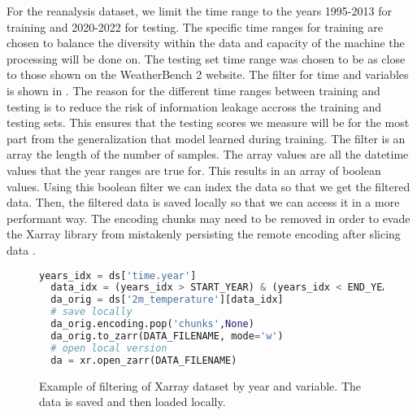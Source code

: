 For the reanalysis dataset, we limit the time range to the years 1995{-}2013 for training and 2020{-}2022 for testing. The specific time ranges for training are chosen to balance the diversity within the data and capacity of the machine the processing will be done on. The testing set time range was chosen to be as close to those shown on the WeatherBench 2 website. The filter for time and variables is shown in . The reason for the different time ranges between training and testing is to reduce the risk of information leakage accross the training and testing sets. This ensures that the testing scores we measure will be for the most part from the generalization that model learned during training. The filter is an array the length of the number of samples. The array values are all the datetime values that the year ranges are true for. This results in an array of boolean values. Using this boolean filter we can index the data so that we get the filtered data. Then, the filtered data is saved locally so that we can access it in a more performant way. The encoding chunks may need to be removed in order to evade the Xarray library from mistakenly persisting the remote encoding after slicing data \autocite{ianZarrEncodingAttributes}.
\begin{figure}[H]
  \centering
  \begin{lstlisting}[language=Python]
  years_idx = ds['time.year']
  data_idx = (years_idx > START_YEAR) & (years_idx < END_YEAR)
  da_orig = ds['2m_temperature'][data_idx]
  # save locally
  da_orig.encoding.pop('chunks',None)
  da_orig.to_zarr(DATA_FILENAME, mode='w')
  # open local version
  da = xr.open_zarr(DATA_FILENAME)
  \end{lstlisting}
  \caption{Example of filtering of Xarray dataset by year and variable. The data is saved and then loaded locally.}\label{fig:wb2_retrieval}
\end{figure}

